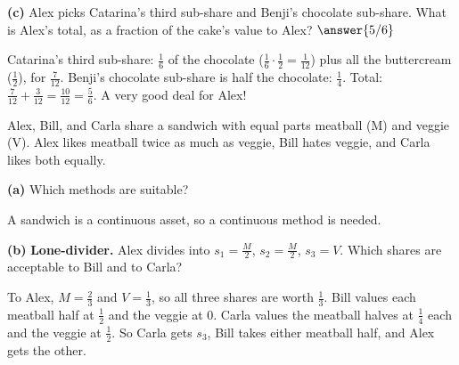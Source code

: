 \documentclass[12pt]{ximera}
\begin{document}
\begin{problem}
\begin{prompt}
\textbf{(c)} Alex picks Catarina's third sub-share and Benji's chocolate sub-share. What
is Alex's total, as a fraction of the cake's value to Alex? $\answer{5/6}$
\begin{feedback}
Catarina's third sub-share: $\frac16$ of the chocolate ($\frac16\cdot\frac12=\frac1{12}$)
plus all the buttercream ($\frac12$), for $\frac7{12}$. Benji's chocolate sub-share is
half the chocolate: $\frac14$. Total: $\frac7{12}+\frac3{12}=\frac{10}{12}=\frac56$. A
very good deal for Alex!
\end{feedback}
\end{prompt}
\end{problem}

\begin{problem}
Alex, Bill, and Carla share a sandwich with equal parts meatball (M) and veggie (V).
Alex likes meatball twice as much as veggie, Bill hates veggie, and Carla likes both
equally.

\begin{prompt}
\textbf{(a)} Which methods are suitable?
\begin{selectAll}
\end{selectAll}
\begin{feedback}
A sandwich is a continuous asset, so a continuous method is needed.
\end{feedback}
\end{prompt}

\begin{prompt}
\textbf{(b)} \textbf{Lone-divider.} Alex divides into $s_1=\frac M2$, $s_2=\frac M2$,
$s_3=V$. Which shares are acceptable to Bill and to Carla?

\begin{selectAll}
\end{selectAll}
\begin{feedback}
To Alex, $M=\frac23$ and $V=\frac13$, so all three shares are worth $\frac13$. Bill values
each meatball half at $\frac12$ and the veggie at $0$. Carla values the meatball halves at
$\frac14$ each and the veggie at $\frac12$. So Carla gets $s_3$, Bill takes either
meatball half, and Alex gets the other.
\end{feedback}
\end{prompt}


\end{problem}
\end{document}

